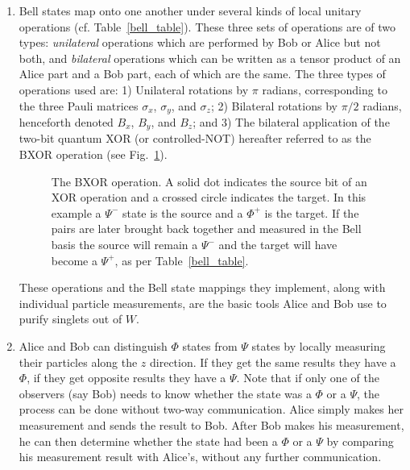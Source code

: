 \begin{enumerate}
\item Bell states map onto one another under several kinds of local
unitary operations (cf. Table~\ref{bell_table}). These three sets of
operations are of two types: {\em unilateral\/} operations which are
performed by Bob or Alice but not both, and {\em bilateral\/}
operations which can be written as a tensor product of an Alice part
and a Bob part, each of which are the same.  The three types of
operations used are: 1) Unilateral rotations by $\pi$ radians,
corresponding to the three Pauli matrices $\sigma_x$, $\sigma_y$, and
$\sigma_z$; 2) Bilateral rotations by $\pi/2$ radians, henceforth
denoted $B_x$, $B_y$, and $B_z$; and 3) The bilateral application of
the two-bit quantum XOR (or controlled-NOT)\cite{G9,PT} hereafter
referred to as the BXOR operation (see Fig.~\ref{bxorfig}).
\begin{figure}[htbp]
\centerline{}
\caption[BXOR operation]{The BXOR operation.  A solid dot indicates the source bit of
an XOR operation\protect\cite{G9} and a crossed circle indicates the target.
In this example a $\Psi^-$ state is the
source and a $\Phi^+$ is the target.  If the pairs are later brought
back together and measured in the Bell basis the source will remain
a $\Psi^-$ and the target will have become a $\Psi^+$, as per
Table~\protect\ref{bell_table}.
\label{bxorfig}}
\end{figure}
These operations and the Bell state mappings they implement, along with
individual particle measurements, are the basic tools Alice and Bob use
to purify singlets out of $W$.\label{i3}
 
\item Alice and Bob can distinguish $\Phi$ states from $\Psi$ states
by locally measuring their particles along the $z$ direction.  If they
get the same results they have a $\Phi$, if they get opposite results
they have a $\Psi$.  Note that if only one of the observers (say Bob)
needs to know whether the state was a $\Phi$ or a $\Psi$, the process
can be done without two-way communication.  Alice simply makes her
measurement and sends the result to Bob.  After Bob makes his
measurement, he can then determine whether the state had been a $\Phi$
or a $\Psi$ by comparing his measurement result with Alice's, without
any further communication.\label{i4}
 

\end{enumerate}
